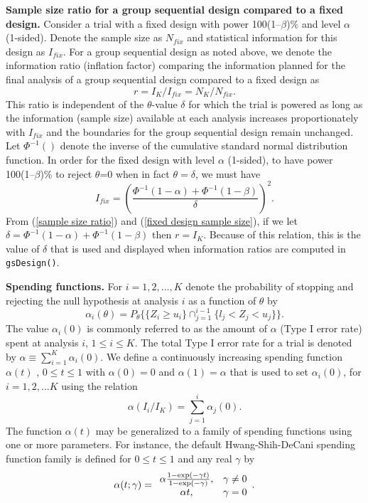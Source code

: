 \textbf{Sample size ratio for a group sequential design compared to a fixed
design.} Consider a trial with a fixed design with power 100(1--$\beta$)\% and
level $\alpha$ (1-sided). Denote the sample size as $N_{fix}$ and statistical
information for this design as $I_{fix}$. For a group sequential design as
noted above, we denote the information ratio (inflation factor) comparing
the information planned for the final analysis of a group sequential design
compared to a fixed design as
\begin{equation}
r=I_{K}/I_{fix}=N_{K}/N_{fix}.\label{sample size ratio}%
\end{equation}
This ratio is independent of the $\theta$-value $\delta$ for which the trial
is powered as long as the information (sample size) available at each analysis
increases proportionately with $I_{fix}$ and the boundaries for the group
sequential design remain unchanged. Let $\Phi^{-1}()$ denote the inverse of
the cumulative standard normal distribution function. In order for the fixed
design with level $\alpha$ (1-sided), to have power 100(1--$\beta$)\% to
reject $\theta$=0 when in fact $\theta=\delta$, we must have
\begin{equation}
I_{fix}=\left(  \frac{\Phi^{-1}(1-\alpha)+\Phi^{-1}(1-\beta)}{\delta}\right)
^{2}.\label{fixed design sample size}%
\end{equation}
From (\ref{sample size ratio}) and (\ref{fixed design sample size}), if we let
$\delta=\Phi^{-1}(1-\alpha)+\Phi^{-1}(1-\beta)$ then $r=I_{K}$. Because of
this relation, this is the value of $\delta$ that is used and displayed when
information ratios are computed in \texttt{gsDesign()}.

\textbf{Spending functions.} For $i=1,2,\ldots,K$ denote the probability of
stopping and rejecting the null hypothesis at analysis $i$ as a function of
$\theta$ by
\begin{equation}
\alpha_{i}(\theta)=P_{\theta}\{\{Z_{i}\geq u_{i}\}\cap_{j=1}^{i-1}%
\{l_{j}<Z_{j}<u_{j}\}\}.\label{alpha(theta)}%
\end{equation}
The value $\alpha_{i}(0)$ is commonly referred to as the amount of $\alpha$
(Type I error rate) spent at analysis $i$, $1\leq i\leq K$. The total Type I
error rate for a trial is denoted by $\alpha\equiv\sum_{i=1}^{K}%
\alpha_{i}(0)$. We define a continuously increasing spending function
$\alpha(t)$ , $0\leq t\leq1$ with $\alpha\left(  0\right)  =0$ and
$\alpha\left(  1\right)  =\alpha$ that is used to set $\alpha_{i}(0)$,
for $i=1,2,...K$ using the relation
\begin{equation}
\alpha(I_{i}/I_{K})=\sum_{j=1}^{i}\alpha_{j}(0).\label{alpha spending}%
\end{equation}
The function $\alpha(t)$ may be generalized to a family of spending functions
using one or more parameters. For instance, the default Hwang-Shih-DeCani
spending function family is defined for $0\leq t\leq1$ and any real $\gamma$
by
\[
\alpha(t;\gamma)=%
\begin{array}
[c]{cc}%
\alpha\frac{1-\exp(-\gamma t)}{1-\exp(-\gamma)}, & \gamma\neq0\\
\alpha t, & \gamma=0
\end{array}
.
\]


